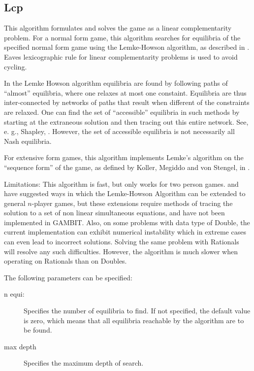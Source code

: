{\subsection{Lcp}\label{Lcp}
This algorithm formulates and solves the game as a linear complementarity problem.  
For a normal form game, this algorithm searches for equilibria of the
specified normal form game using the Lemke-Howson algorithm, as described
in \cite{LemHow:64}. Eaves \cite{Eav:71} lexicographic rule for
linear complementarity problems is used to avoid cycling.

In the Lemke Howson algorithm equilibria are found by following paths of
``almost'' equilibria, where one relaxes at most one constaint.
Equilibria are thus inter-connected by networks of paths that result when
different of the constraints are relaxed.  One can find the set of
``accessible''  equilibria in such methods by starting at the extraneous
solution and then tracing out this entire network.  See, e. g., Shapley,
\cite{Sha:74}.  However, the set of accessible equilibria is not necessarily all
Nash equilibria.

For extensive form games, this algorithm implements Lemke's algorithm
on the ``sequence form'' of the game, as defined by Koller, Megiddo 
and von Stengel, in \cite{KolMegSte:94}.

Limitations: This algorithm is fast, but only works for two person
games.  \cite{Wilson:1971} and \cite{Rosenmuller:1971} have suggested
ways in which the Lemke-Howson Algorithm can be extended to general 
$n$-player games, but these extensions require methods of tracing the 
solution to a set of non linear simultaneous equations, and have not 
been implemented in GAMBIT.  Also, on some problems with data type of 
Double, the current implementation can exhibit numerical instability 
which in extreme cases can even lead to incorrect solutions.  Solving 
the same problem with Rationals will resolve any such difficulties.
However, the algorithm is much slower when operating on Rationals than 
on Doubles.

The following parameters can be specified:

\begin{description}
\item[n equi:] Specifies the number of equilibria to find.  If not specified,
the default value is zero, which means that all equilibria reachable by
the algorithm are to be found.
\item[max depth]
Specifies the maximum depth of search.
\end{description}

}
